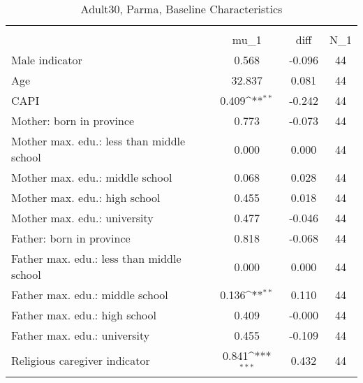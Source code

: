 \begin{table}[htbp]\centering
\def\sym#1{\ifmmode^{#1}\else\(^{#1}\)\fi}
\caption{Adult30, Parma, Baseline Characteristics}
\begin{tabular}{l*{1}{ccc}}
\toprule
                    &\multicolumn{3}{c}{}                           \\
                    &        mu\_1         &        diff&         N\_1\\
\midrule
Male indicator      &       0.568         &      -0.096&          44\\
Age                 &      32.837         &       0.081&          44\\
CAPI                &       0.409\sym{**} &      -0.242&          44\\
Mother: born in province&       0.773         &      -0.073&          44\\
Mother max. edu.: less than middle school&       0.000         &       0.000&          44\\
Mother max. edu.: middle school&       0.068         &       0.028&          44\\
Mother max. edu.: high school&       0.455         &       0.018&          44\\
Mother max. edu.: university&       0.477         &      -0.046&          44\\
Father: born in province&       0.818         &      -0.068&          44\\
Father max. edu.: less than middle school&       0.000         &       0.000&          44\\
Father max. edu.: middle school&       0.136\sym{**} &       0.110&          44\\
Father max. edu.: high school&       0.409         &      -0.000&          44\\
Father max. edu.: university&       0.455         &      -0.109&          44\\
Religious caregiver indicator&       0.841\sym{***}&       0.432&          44\\
\bottomrule
\end{tabular}
\end{table}
